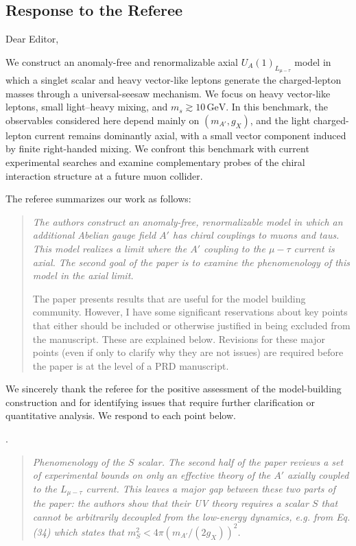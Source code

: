 \documentclass[12pt,a4paper]{article}
\begin{document}
\subsection*{Response to the Referee}

\noindent Dear Editor,

We construct an anomaly-free and renormalizable axial \(U_A(1)_{L_{\mu-\tau}}\) model in which a singlet scalar and heavy vector-like leptons generate the charged-lepton masses through a universal-seesaw mechanism. We focus on heavy vector-like leptons, small light--heavy mixing, and \(m_s\gtrsim10\,\mathrm{GeV}\). In this benchmark, the observables considered here depend mainly on \((m_{A'},g_X)\), and the light charged-lepton current remains dominantly axial, with a small vector component induced by finite right-handed mixing. We confront this benchmark with current experimental searches and examine complementary probes of the chiral interaction structure at a future muon collider.

The referee summarizes our work as follows:

\begin{quote}
\itshape
The authors construct an anomaly-free, renormalizable model in which an additional Abelian gauge field \(A'\) has chiral couplings to muons and taus. This model realizes a limit where the \(A'\) coupling to the \(\mu-\tau\) current is axial. The second goal of the paper is to examine the phenomenology of this model in the axial limit.

The paper presents results that are useful for the model building community. However, I have some significant reservations about key points that either should be included or otherwise justified in being excluded from the manuscript. These are explained below. Revisions for these major points (even if only to clarify why they are not issues) are required before the paper is at the level of a PRD manuscript.
\end{quote}

We sincerely thank the referee for the positive assessment of the model-building construction and for identifying issues that require further clarification or quantitative analysis. We respond to each point below.

\medskip
{}. \begin{quote}\itshape
Phenomenology of the \(S\) scalar. The second half of the paper reviews a set of experimental bounds on only an effective theory of the \(A'\) axially coupled to the \(L_{\mu-\tau}\) current. This leaves a major gap between these two parts of the paper: the authors show that their UV theory requires a scalar \(S\) that cannot be arbitrarily decoupled from the low-energy dynamics, e.g. from Eq. (34) which states that \(m_S^2 < 4\pi\left(m_{A'}/(2g_X)\right)^2\).\end{quote}
\end{document}
